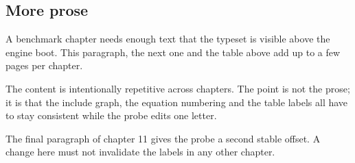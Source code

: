 \subsection{More prose}
A benchmark chapter needs enough text that the type\-set is visible above the
engine boot. This paragraph, the next one and the table above add up to a few
pages per chapter.

The content is intentionally repetitive across chapters. The point is not the
prose; it is that the include graph, the equation numbering and the table
labels all have to stay consistent while the probe edits one letter.

The final paragraph of chapter 11 gives the probe a second stable offset. A
change here must not invalidate the labels in any other chapter.
